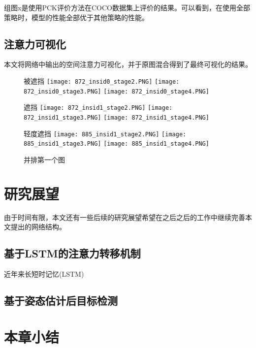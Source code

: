 组图x是使用PCK评价方法在COCO数据集上评价的结果。可以看到，在使用全部策略时，模型的性能全部优于其他策略的性能。

\subsection{注意力可视化}
\label{sec:weaksuperatten}
本文将网络中输出的空间注意力可视化，并于原图混合得到了最终可视化的结果。
\label{subsec:attenexp}
\begin{figure}
	\begin{minipage}{\textwidth}
		被遮挡
		\centering
		\texttt{[image: 872\_insid0\_stage2.PNG]}
		\texttt{[image: 872\_insid0\_stage3.PNG]}
		\texttt{[image: 872\_insid0\_stage4.PNG]}
	\end{minipage}
	\vskip0.2cm
	\begin{minipage}{\textwidth}
		遮挡
		\centering
		\texttt{[image: 872\_insid1\_stage2.PNG]}
		\texttt{[image: 872\_insid1\_stage3.PNG]}
		\texttt{[image: 872\_insid1\_stage4.PNG]}
	\end{minipage}
	\begin{minipage}{\textwidth}
		轻度遮挡
		\centering
		\texttt{[image: 885\_insid1\_stage2.PNG]}
		\texttt{[image: 885\_insid1\_stage3.PNG]}
		\texttt{[image: 885\_insid1\_stage4.PNG]}
	\end{minipage}
	\label{fig:parallel1}
	\caption{并排第一个图}
\end{figure}

\section{研究展望}
\label{sec:future}
由于时间有限，本文还有一些后续的研究展望希望在之后之后的工作中继续完善本文提出的网络结构。
\subsection{基于LSTM的注意力转移机制}
\label{subsec:lstmatten}
近年来长短时记忆(LSTM)
\subsection{基于姿态估计后目标检测}
\label{subsec:semisuperdetect}

\section{本章小结}